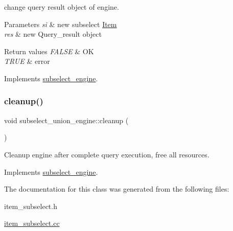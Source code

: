 change query result object of engine.


\begin{DoxyParams}{Parameters}
{\em si} & new subselect \mbox{\hyperlink{classItem}{Item}} \\
\hline
{\em res} & new Query\+\_\+result object\\
\hline
\end{DoxyParams}

\begin{DoxyRetVals}{Return values}
{\em F\+A\+L\+SE} & OK \\
\hline
{\em T\+R\+UE} & error \\
\hline
\end{DoxyRetVals}


Implements \mbox{\hyperlink{classsubselect__engine}{subselect\+\_\+engine}}.

\mbox{\label{classsubselect__union__engine_ae433d4bdefcf00170920ace3c91332cc}} 
\subsubsection{\texorpdfstring{cleanup()}{cleanup()}}
{\footnotesize\ttfamily void subselect\+\_\+union\+\_\+engine\+::cleanup (\begin{DoxyParamCaption}{ }\end{DoxyParamCaption})\hspace{0.3cm}{\ttfamily [virtual]}}

Cleanup engine after complete query execution, free all resources. 

Implements \mbox{\hyperlink{classsubselect__engine_a0f0051f24ecc4b20f0e3f8d817293276}{subselect\+\_\+engine}}.



The documentation for this class was generated from the following files\+:\begin{DoxyCompactItemize}
\item 
item\+\_\+subselect.\+h\item 
\mbox{\hyperlink{item__subselect_8cc}{item\+\_\+subselect.\+cc}}\end{DoxyCompactItemize}
